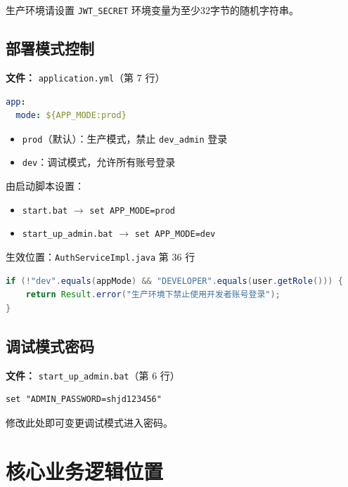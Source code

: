 \documentclass[12pt,a4paper]{ctexart}
\begin{document}
生产环境请设置 \texttt{JWT\_SECRET} 环境变量为至少32字节的随机字符串。

\subsection{部署模式控制}

\textbf{文件：} \texttt{application.yml}（第 7 行）

\begin{lstlisting}[language=yaml]
app:
  mode: ${APP_MODE:prod}
\end{lstlisting}

\begin{itemize}
    \item \texttt{prod}（默认）：生产模式，禁止 \texttt{dev\_admin} 登录
    \item \texttt{dev}：调试模式，允许所有账号登录
\end{itemize}

由启动脚本设置：
\begin{itemize}
    \item \texttt{start.bat} $\rightarrow$ \texttt{set APP\_MODE=prod}
    \item \texttt{start\_up\_admin.bat} $\rightarrow$ \texttt{set APP\_MODE=dev}
\end{itemize}

生效位置：\texttt{AuthServiceImpl.java} 第 36 行

\begin{lstlisting}[language=java]
if (!"dev".equals(appMode) && "DEVELOPER".equals(user.getRole())) {
    return Result.error("生产环境下禁止使用开发者账号登录");
}
\end{lstlisting}

\subsection{调试模式密码}

\textbf{文件：} \texttt{start\_up\_admin.bat}（第 6 行）

\begin{lstlisting}[language=batch]
set "ADMIN_PASSWORD=shjd123456"
\end{lstlisting}

修改此处即可变更调试模式进入密码。

\newpage
\section{核心业务逻辑位置}
\end{document}

